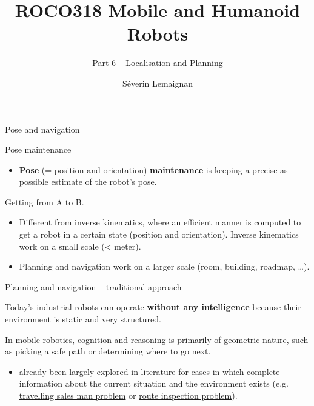 \documentclass[compress]{beamer}
\title{ROCO318 \newline Mobile and Humanoid Robots}
\subtitle{Part 6 -- Localisation and Planning}
\date{}
\author{Séverin Lemaignan}
\institute{Centre for Neural Systems and Robotics\\{\bf Plymouth University}}
\begin{document}

\maketitle

\begin{frame}{Pose and navigation}

Pose maintenance

\begin{itemize}
\item \textbf{Pose} (= position and orientation) \textbf{maintenance} is
  keeping a precise as possible estimate of the robot's pose.
\end{itemize}

Getting from A to B.

\begin{itemize}
\item Different from inverse kinematics, where an efficient manner is
  computed to get a robot in a certain state (position and orientation).
  Inverse kinematics work on a small scale (\textless{} meter).
\item Planning and navigation work on a larger scale (room, building,
  roadmap, \ldots{}).
\end{itemize}

\end{frame}

\begin{frame}{Planning and navigation -- traditional approach}

Today's industrial robots can operate \textbf{without any intelligence} because
their environment is static and very structured.

In mobile robotics, cognition and reasoning is primarily of geometric
nature, such as picking a safe path or determining where to go next.

\begin{itemize}
\item already been largely explored in literature for cases in which
  complete information about the current situation and the environment
  exists (e.g.
  \href{http://en.wikipedia.org/wiki/Travelling_salesman_problem}{travelling
  sales man problem} or
  \href{http://en.wikipedia.org/wiki/Route_inspection_problem}{route
  inspection problem}).
\end{itemize}

\end{frame}
\end{document}
